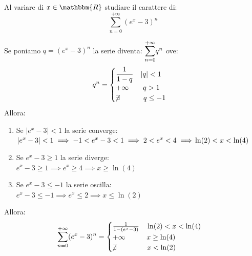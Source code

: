 \documentclass[12pt]{report}
\newcounter{exercise}
\begin{document}
 		\begin{assignment}{}{}
 			Al variare di $x \in \mathbbm{R}$ studiare il carattere di:\[
 			\sum_{n=0}^{+\infty}(e^x-3)^n
 			\]
 			\begin{exercise}{}{}
 				Se poniamo $q = (e^x - 3)^n$ la serie diventa: $\mathlarger{\sum_{n=0}^{+\infty}}q^n$ ove:
 				\[
 				q^n = \begin{cases}
 					\dfrac{1}{1 - q}\quad |q| < 1 \\
 					+\infty \quad\quad q > 1 \\
 					\centernot{\exists}\quad\quad\quad q \leq -1
 				\end{cases}
 				\]
 				Allora:
 				\begin{enumerate}
 					\item Se $|e^x - 3| < 1$ la serie converge: \\
 					$|e^x - 3| < 1 \implies - 1< e^x -3 < 1 \implies 2 < e^x < 4 \implies \\ \ln(2) < x < \ln(4)$
 					\item Se $e^x - 3 \geq 1$ la serie diverge: \\
 					$e^x - 3 \geq 1 \implies e^x \geq 4 \implies x \geq \ln(4)$
 					\item Se $e^x - 3 \leq -1$ la serie oscilla: \\
 					$e^x - 3 \leq - 1\implies e^x \leq 2 \implies x \leq \ln(2)$
 				\end{enumerate}
 				Allora:
 				\[
 				\sum_{n=0}^{+\infty}(e^x - 3)^n=\begin{cases}
 					\frac{1}{1-(e^x - 3)} \quad \ln(2) < x < \ln(4) \\
 					+\infty \quad\quad\quad x \geq \ln(4) \\
 					\centernot{\exists} \quad\quad\quad\quad  x < \ln(2)
 				\end{cases}
 				\]
 			\end{exercise}
 		\end{assignment}
\end{document}
